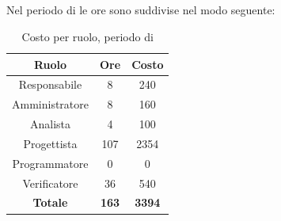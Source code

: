 \subsection{\PD}
Nel periodo di \PD{} le ore sono suddivise nel modo seguente:
\begin{table}[H]
	\centering
	\begin{tabular}{|c|c|c|}
		\hline
		\textbf{Ruolo} &
		\textbf{Ore} &
		\textbf{Costo} \\
		\hline
		Responsabile & 8 & 240 \\
		\hline
		Amministratore & 8 & 160 \\
		\hline
		Analista & 4 & 100\\
		\hline
		Progettista & 107 & 2354 \\
		\hline
		Programmatore & 0 & 0 \\
		\hline
		Verificatore & 36 & 540 \\
		\hline
		\textbf{Totale} & \textbf{163} & \textbf{3394} \\
		\hline
	\end{tabular}
	\caption{Costo per ruolo, periodo di \PD}
\end{table}

